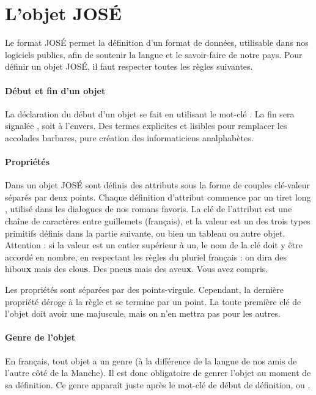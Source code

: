 \documentclass[french]{article}
\begin{document}
\section{L'objet JOSÉ}{
    Le format JOSÉ permet la définition d'un format de données, utilisable dans nos logiciels publics, afin de soutenir la langue et le savoir-faire de notre pays. Pour définir un objet JOSÉ, il faut respecter toutes les règles suivantes.
    \paragraph{Début et fin d'un objet} {
        La déclaration du début d'un objet se fait en utilisant le mot-clé . La fin sera signalée , soit  à l'envers. Des termes explicites et lisibles pour remplacer les accolades barbares, pure création des informaticiens analphabètes.}
        
    \paragraph{Propriétés} {
        Dans un objet JOSÉ sont définis des attributs sous la forme de couples clé-valeur séparés par deux points. Chaque définition d'attribut commence par un tiret long \textquote{\textemdash}, utilisé dans les dialogues de nos romans favoris. La clé de l'attribut est une chaîne de caractères entre guillemets (français), et la valeur est un des trois types primitifs définis dans la partie suivante, ou bien un tableau ou autre objet. Attention : si la valeur est un entier supérieur à un, le nom de la clé doit y être accordé en nombre, en respectant les règles du pluriel français : on dira des hibou\textbf{x} mais des clou\textbf{s}. Des pneu\textbf{s} mais des aveu\textbf{x}. Vous avez compris.
        
        Les propriétés sont séparées par des points-virgule. Cependant, la dernière propriété déroge à la règle et se termine par un point. La toute première clé de l'objet doit avoir une majuscule, mais on n'en mettra pas pour les autres.
    }
    \paragraph{Genre de l'objet} {
        En français, tout objet a un genre (à la différence de la langue de nos amis de l'autre côté de la Manche). Il est donc obligatoire de genrer l'objet au moment de sa définition. Ce genre apparaît juste après le mot-clé  de début de définition,  ou .
    }
}
\end{document}
